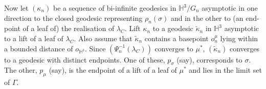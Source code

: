 \documentclass{amsart}
\theoremstyle{definition}
\newtheorem{rmk}[theorem]{Remark}
\newcommand\HHH{{\mathbb H}}
\begin{document}

%  




Now let $(\kappa_n)$ be a sequence of  bi-infinite geodesics in $\HHH^3/G_n$ asymptotic in one direction to the closed geodesic representing $\rho_n(\sigma)$ and in the other to (an end-point of a leaf of) the realisation
of $\lambda_C$.  
Lift $\kappa_n$ to a geodesic $\tilde \kappa_n$ in $\HHH^3$ asymptotic to a lift of a leaf of $\lambda_C$. Also assume that  $\tilde \kappa_n$ contains a basepoint $o_n^\mu$ lying within a bounded distance of $o_{\HHH^3}$.
Since  $(\Psi_n^{-1}(\lambda_C))$ converges to  $\mu^\ast$,   $(\tilde\kappa_n)$ converges  to a geodesic with  distinct endpoints. One of these, $p_\sigma$ (say), corresponds to $ \sigma$. The other,
 $p_\mu$ (say),  is the endpoint of a lift of a leaf of $\mu^*$ and lies in the limit set of $\Gamma$. 
 
\end{document}
